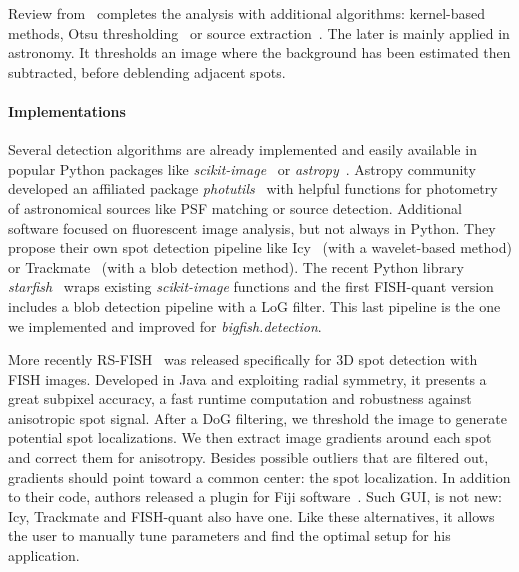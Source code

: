 Review from~\cite{ruusuvuori_evaluation_2010} completes the analysis with additional algorithms: kernel-based methods, Otsu thresholding~\cite{Otsu_1979} or source extraction~\cite{bertin_sextractor_1996}.
The later is mainly applied in astronomy.
It thresholds an image where the background has been estimated then subtracted, before deblending adjacent spots.

\paragraph{Implementations}

Several detection algorithms are already implemented and easily available in popular Python packages like \emph{scikit-image}~\cite{walt_scikit-image_2014} or \emph{astropy}~\cite{astropy_2018}.
Astropy community developed an affiliated package \emph{photutils}~\cite{larry_bradley_2020_4044744} with helpful functions for photometry of astronomical sources like \ac{PSF} matching or source detection.
Additional software focused on fluorescent image analysis, but not always in Python.
They propose their own spot detection pipeline like Icy~\cite{de_chaumont_icy_2012} (with a wavelet-based method) or Trackmate~\cite{ershov_trackmate_2022} (with a blob detection method).
The recent Python library \emph{starfish}~\cite{perkel_starfish_2019} wraps existing \emph{scikit-image} functions and the first FISH-quant version~\cite{mueller_fish-quant_2013} includes a blob detection pipeline with a \ac{LoG} filter.
This last pipeline is the one we implemented and improved for \emph{bigfish.detection}.

More recently RS-FISH~\cite{bahry_rs-fish_2021} was released specifically for 3D spot detection with \ac{FISH} images.
Developed in Java and exploiting radial symmetry, it presents a great subpixel accuracy, a fast runtime computation and robustness against anisotropic spot signal.
After a \ac{DoG} filtering, we threshold the image to generate potential spot localizations.
We then extract image gradients around each spot and correct them for anisotropy.
Besides possible outliers that are filtered out, gradients should point toward a common center: the spot localization.
In addition to their code, authors released a plugin for Fiji software~\cite{schindelin_fiji_2012}.
Such \ac{GUI}, is not new: Icy, Trackmate and FISH-quant also have one.
Like these alternatives, it allows the user to manually tune parameters and find the optimal setup for his application.

